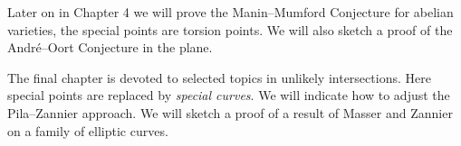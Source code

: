 Later on in Chapter 4 we will prove the Manin--Mumford Conjecture for
abelian varieties, the special points are torsion points. We will also
sketch a proof of the Andr\'e--Oort Conjecture in the plane.

The final chapter is devoted to selected topics in unlikely
intersections. Here special points are replaced by \textit{special
curves}. We will indicate how to adjust the Pila--Zannier approach. We
will sketch a proof of a result of Masser and Zannier on a family of
elliptic curves.

